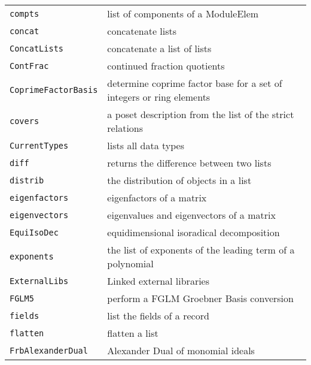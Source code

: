 \documentclass[a4paper]{mybook}
\begin{document}
\begin{center}
\begin{longtable}{ll}
{\verb~compts~} &
      list of components of a ModuleElem\\
   
{\verb~concat~} &
      concatenate lists\\
   
{\verb~ConcatLists~} &
      concatenate a list of lists\\
   
{\verb~ContFrac~} &
      continued fraction quotients\\
   
{\verb~CoprimeFactorBasis~} &
      determine coprime factor base for a set of integers or ring elements\\
   
{\verb~covers~} &
      a poset description from the list of the strict relations\\
   
{\verb~CurrentTypes~} &
      lists all data types\\
   
{\verb~diff~} &
      returns the difference between two lists\\
   
{\verb~distrib~} &
      the distribution of objects in a list\\
   
{\verb~eigenfactors~} &
      eigenfactors of a matrix\\
   
{\verb~eigenvectors~} &
      eigenvalues and eigenvectors of a matrix\\
   
{\verb~EquiIsoDec~} &
      equidimensional isoradical decomposition\\
   
{\verb~exponents~} &
      the list of exponents of the leading term of a polynomial\\
   
{\verb~ExternalLibs~} &
      Linked external libraries\\
   
{\verb~FGLM5~} &
      perform a FGLM Groebner Basis conversion\\
   
{\verb~fields~} &
      list the fields of a record\\
   
{\verb~flatten~} &
      flatten a list\\
   
{\verb~FrbAlexanderDual~} &
      Alexander Dual of monomial ideals\\
   

\end{longtable}
\end{center}
\end{document}
